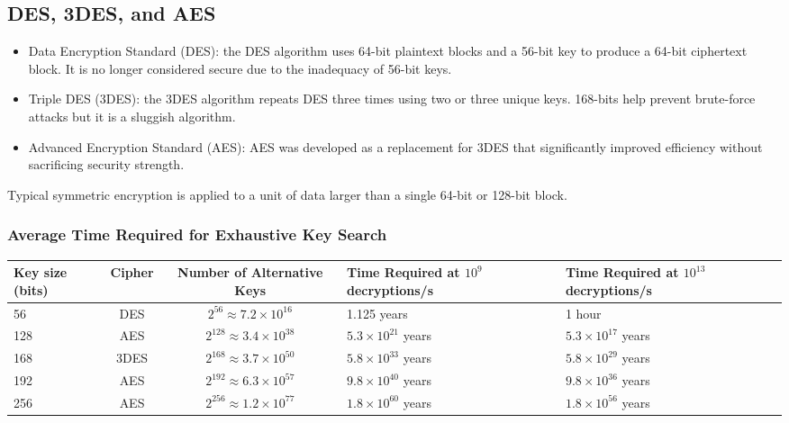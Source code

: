 \documentclass{math}
\begin{document}
\subsection*{DES, 3DES, and AES}
\begin{itemize}
  \item Data Encryption Standard (DES): the DES algorithm uses 64-bit plaintext
  blocks and a 56-bit key to produce a 64-bit ciphertext block. It is no longer
  considered secure due to the inadequacy of 56-bit keys.
  \item Triple DES (3DES): the 3DES algorithm repeats DES three times using two
  or three unique keys. 168-bits help prevent brute-force attacks but it is a
  sluggish algorithm.
  \item Advanced Encryption Standard (AES): AES was developed as a replacement
  for 3DES that significantly improved efficiency without sacrificing security
  strength.
\end{itemize}
Typical symmetric encryption is applied to a unit of data larger than a single
64-bit or 128-bit block.

\subsubsection*{Average Time Required for Exhaustive Key Search}
\begin{center}
  \begin{tabular}{|p{1cm}|c|c|p{3cm}|p{3cm}|}
    \hline
    Key size (bits) & Cipher & Number of Alternative Keys &
      Time Required at \( 10^9 \) decryptions/s &
      Time Required at \( 10^13 \) decryptions/s \\
    \hline
    56 & DES & \( 2^{56}\approx7.2\times10^{16} \) & 1.125 years & 1 hour \\
    \hline
    128 & AES & \( 2^{128}\approx3.4\times10^{38} \) & \( 5.3\times10^{21} \)
      years & \( 5.3\times10^{17} \) years \\
    \hline
    168 & 3DES & \( 2^{168}\approx3.7\times10^{50} \) & \( 5.8\times10^{33} \)
      years & \( 5.8\times10^{29} \) years \\
    \hline
    192 & AES & \( 2^{192}\approx6.3\times10^{57} \) & \( 9.8\times10^{40} \)
      years & \( 9.8\times10^{36} \) years \\
    \hline
    256 & AES & \( 2^{256}\approx1.2\times10^{77} \) & \( 1.8\times10^{60} \)
      years & \( 1.8\times10^{56} \) years \\
    \hline
  \end{tabular}
\end{center}
\end{document}
